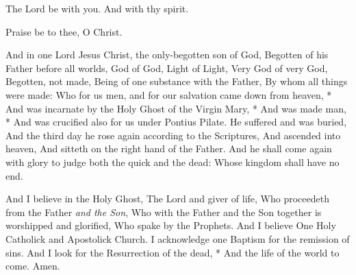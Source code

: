 \V The Lord be with you. \R And with thy spirit. 


\centerline{}
\centerline{Praise be to thee, O Christ.}

\bigskip



And in one Lord Jesus Christ, the only-begotten son of God, Begotten of his Father before all worlds, God of God, Light of Light, Very God of very God, Begotten, not made, Being of one substance with the Father, By whom all things were made: Who for us men, and for our salvation came down from heaven, * And was incarnate by the Holy Ghost of the Virgin Mary, * And was made man, * And was crucified also for us under Pontius Pilate. He suffered and was buried, And the third day he rose again according to the Scriptures, And ascended into heaven, And sitteth on the right hand of the Father. And he shall come again with glory to judge both the quick and the dead: Whose kingdom shall have no end.

And I believe in the Holy Ghost, The Lord and giver of life, Who proceedeth from the Father \emph{and the Son}, Who with the Father and the Son together is worshipped and glorified, Who spake by the Prophets. And I believe One {Holy} Catholick and Apostolick Church. I acknowledge one Baptism for the remission of sins. And I look for the Resurrection of the dead, * And the life of the world to come. Amen.

\bigskip
{}%



